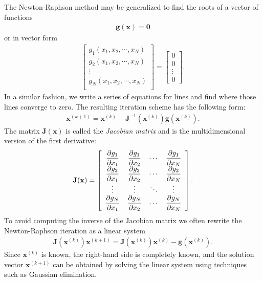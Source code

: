 The Newton-Raphson method may be generalized to find the roots of a vector of functions
\begin{align}
  \mathbf{g}(\mathbf{x}) = \mathbf{0} \nonumber
\end{align}
or in vector form
\begin{align}
  \left[ \begin{array}{c} g_1(x_1,x_2,\cdots,x_N) \\ g_2(x_1,x_2,\cdots,x_N) \\ \vdots \\ g_N(x_1,x_2,\cdots,x_N) \\ \end{array} \right] =
  \left[ \begin{array}{c} 0 \\ 0 \\ \vdots \\ 0 \end{array} \right] . \nonumber
\end{align}
In a similar fashion, we write a series of equations for lines and find where those lines converge to zero. The resulting iteration scheme has the following form:
\begin{align}
  \mathbf{x}^{(k+1)} = \mathbf{x}^{(k)} - \mathbf{J}^{-1}(\mathbf{x}^{(k)}) \mathbf{g}(\mathbf{x}^{(k)}) .
\end{align}
The matrix $\mathbf{J}(\mathbf{x})$ is called the \emph{Jacobian matrix} and is the multidimensional version of the first derivative:
\begin{align}
  \mathbf{J}(\mathbf{x}) = \left[ \begin{array}{c c c c}
  \dfrac{\partial g_1}{\partial x_1} & \dfrac{\partial g_1}{\partial x_2} & \cdots & \dfrac{\partial g_1}{\partial x_N} \\
  \dfrac{\partial g_2}{\partial x_1} & \dfrac{\partial g_2}{\partial x_2} & \cdots & \dfrac{\partial g_2}{\partial x_N} \\
  \vdots & \vdots & \ddots & \vdots \\
  \dfrac{\partial g_N}{\partial x_1} & \dfrac{\partial g_N}{\partial x_2} & \cdots & \dfrac{\partial g_N}{\partial x_N} \\ \end{array} \right] .
\end{align}
To avoid computing the inverse of the Jacobian matrix we often rewrite the Newton-Raphson iteration as a linear system
\begin{align}
  \mathbf{J}(\mathbf{x}^{(k)}) \mathbf{x}^{(k+1)} = \mathbf{J}(\mathbf{x}^{(k)}) \mathbf{x}^{(k)} -\mathbf{g}(\mathbf{x}^{(k)}) .
\end{align}
Since $\mathbf{x}^{(k)}$ is known, the right-hand side is completely known, and the solution vector $\mathbf{x}^{(k+1)}$ can be obtained by solving the linear system using techniques such as Gaussian elimination. 

